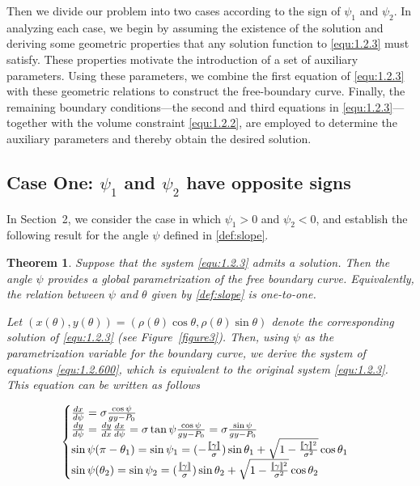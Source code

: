 \documentclass[letterpaper,reqno,10pt,twoside]{amsart}
\newtheorem{theorem}{Theorem}[section]
\theoremstyle{definition}
\theoremstyle{remark}
\begin{document}
\noindent Then we divide our problem into two cases according to the sign of $\psi_1$ and $\psi_2$. In analyzing each case, we begin by assuming the existence of the solution and deriving some geometric properties that any solution function to \eqref{equ:1.2.3} must satisfy. These properties motivate the introduction of a set of auxiliary parameters. Using these parameters, we combine the first equation of \eqref{equ:1.2.3} with these geometric relations to construct the free-boundary curve. Finally, the remaining boundary conditions—the second and third equations in \eqref{equ:1.2.3}—together with the volume constraint \eqref{equ:1.2.2}, are employed to determine the auxiliary parameters and thereby obtain the desired solution.

\subsection{ \textbf{Case One: $\psi_1$ and $\psi_2$ have opposite signs}}

In Section~2, we consider the case in which $\psi_{1}>0$ and $\psi_{2}<0$, and establish the following result for the angle $\psi$ defined in \eqref{def:slope}.

\begin{theorem}
    Suppose that the system \eqref{equ:1.2.3} admits a solution. Then the angle $\psi$ provides a global parametrization of the free boundary curve. Equivalently, the relation between $\psi$ and $\theta$ given by \eqref{def:slope} is one-to-one.

Let $(x(\theta),y(\theta))=(\rho(\theta)\cos\theta,\rho(\theta)\sin\theta)$ denote the corresponding solution of \eqref{equ:1.2.3} (see Figure~\ref{figure3}). Then, using $\psi$ as the parametrization variable for the boundary curve, we derive the system of equations \eqref{equ:1.2.600}, which is equivalent to the original system \eqref{equ:1.2.3}. This equation can be written as follows

     \begin{equation}{\label{equ:1.2.600}}
    \begin{cases}
        \frac{dx}{d\psi}=\sigma\frac{\cos\psi}{gy-P_{0}}\\
    \frac{dy}{d\psi}=\frac{dy}{dx}\frac{dx}{d\psi}=\sigma\tan\psi\frac{\cos\psi}{gy-P_{0}}=\sigma\frac{\sin\psi}{gy-P_{0}}\\
    \sin\psi(\pi-\theta_1)=\sin\psi_1=(-\frac{[\![\gamma]\!]}{\sigma})\sin\theta_1+\sqrt{1-\frac{[\![\gamma]\!]^{2}}{\sigma^{2}}}\cos\theta_1\\
    \sin\psi(\theta_2)=\sin\psi_{2}=(\frac{[\![\gamma]\!]}{\sigma})\sin\theta_2+\sqrt{1-\frac{[\![\gamma]\!]^{2}}{\sigma^{2}}}\cos\theta_2
    \end{cases}
    \end{equation}
 \end{theorem}
\end{document}
